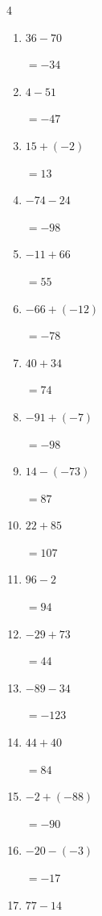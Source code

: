 \begin{multicols}{4}
\begin{enumerate}
  \item $36-70$

        $=-34$

  \item $4-51$

        $=-47$

  \item $15+(-2)$

        $=13$

  \item $-74-24$

        $=-98$

  \item $-11+66$

        $=55$

  \item $-66+(-12)$

        $=-78$

  \item $40+34$

        $=74$

  \item $-91+(-7)$

        $=-98$

  \item $14-(-73)$

        $=87$

  \item $22+85$

        $=107$

  \item $96-2$

        $=94$

  \item $-29+73$

        $=44$

  \item $-89-34$

        $=-123$

\columnbreak %

  \item $44+40$

        $=84$

  \item $-2+(-88)$

        $=-90$

  \item $-20-(-3)$

        $=-17$

  \item $77-14$


\end{enumerate}
\end{multicols}
